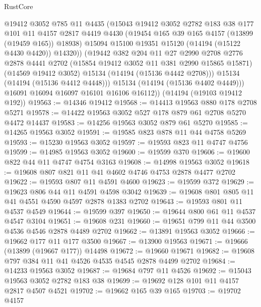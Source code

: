 \begin{lexlean}{RustCore}
\begin{coremodule}
              @19412
              @3052
              @785
              @11
              @4435
              (@15043
                @19412
                @3052
                @2782
                @183
                @38
                @177
                @101
                @11
                @4157
                @2817
                @4419
                @4430
                (@19454 @165 @39 @165 @4157 (@13899 (@19459 @165)) @18938)
                @15094
                @15100
                @19351
                @15120
                (@14194 (@15122 @4430 @4420))
                @14320))
            (@19442
              @382
              @204
              @11
              @27
              @2990
              @2708
              @2776
              @2878
              @4441
              @2702
              (@15854 @19412 @3052 @11 @381 @2990 @15865 @15871)
              (@14569 @19412 @3052)
              @15134
              (@14194 (@15136 @4442 @2708)))
            @15134
            (@14194 (@15136 @4412 @4448)))
          @15134
          (@14194 (@15136 @4402 @4449)))
        @16091
        @16094
        @16097
        @16101
        @16106
        @16112))
    (@14194 (@19103 @19412 @192))
@19563 := @14346 @19412
@19568 := @14413 @19563 @880 @178 @2708 @5271
@19578 := @14422 @19563 @3052 @527 @178 @879 @61 @2708 @5270 @4472 @14437
@19583 := @14256 @19563 @3052 @879 @61 @5270
@19585 := @14265 @19563 @3052
@19591 := @19585 @823 @878 @11 @44 @4758 @5269
@19593 := @15230 @19563 @3052
@19597 := @19593 @823 @11 @4747 @4756
@19599 := @14985 @19563 @3052
@19600 := @19599 @370
@19606 := @19600 @822 @44 @11 @4747 @4754 @3163
@19608 := @14998 @19563 @3052
@19618 := @19608 @807 @821 @11 @41 @4602 @4746 @4753 @2878 @4477 @2702
@19622 := @19593 @807 @11 @4591 @4600
@19623 := @19599 @372
@19629 := @19623 @806 @44 @11 @4591 @4598 @3042
@19639 := @19608 @801 @805 @11 @41 @4551 @4590 @4597 @2878 @1383 @2702
@19643 := @19593 @801 @11 @4537 @4549
@19644 := @19599 @397
@19650 := @19644 @800 @61 @11 @4537 @4547 @3104
@19651 := @19608 @231
@19660 := @19651 @799 @11 @44 @3500 @4536 @4546 @2878 @4489 @2702
@19662 := @13891 @19563 @3052
@19666 := @19662 @177 @11 @177 @3500
@19667 := @13900 @19563
@19671 := @19666 (@13899 (@19667 @177)) @14498
@19672 := @19660 @19671
@19682 := @19608 @797 @384 @11 @41 @4526 @4535 @4545 @2878 @4499 @2702
@19684 := @14233 @19563 @3052
@19687 := @19684 @797 @11 @4526
@19692 := @15043 @19563 @3052 @2782 @183 @38
@19699 := @19692 @128 @101 @11 @4157 @2817 @4507 @4521
@19702 := @19662 @165 @39 @165
@19703 := @19702 @4157

\end{coremodule}
\end{lexlean}
